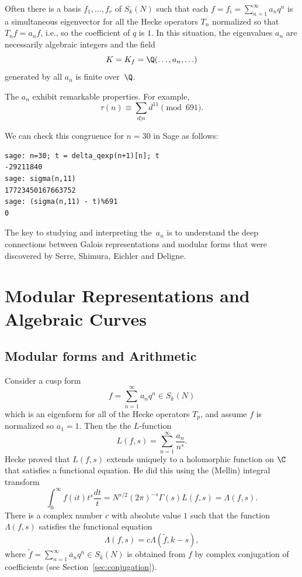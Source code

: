 \documentclass{report}
\begin{document}
Often
there is a basis $f_1,\ldots,f_r$ of
$S_k(N)$ such that each $f=f_i=\sum_{n=1}^{\infty} a_n q^n $ is a
simultaneous eigenvector for all the Hecke operators $T_n$
normalized so that $T_n f = a_n f$, i.e., so the
coefficient of $q$ is $1$.  In this situation, the eigenvalues $a_n$
are necessarily algebraic integers and the field
$$K = K_f = \Q(\ldots,a_n,\ldots)$$
generated by all $a_n$ is finite over~$\Q$.

The $a_n$ exhibit remarkable properties.
For example,
 $$\tau(n) \equiv \sum_{d|n}d^{11} \pmod {691}.$$

We can check this congruence for $n=30$ in Sage as follows:
\begin{lstlisting}
sage: n=30; t = delta_qexp(n+1)[n]; t
-29211840
sage: sigma(n,11)
17723450167663752
sage: (sigma(n,11) - t)%691
0
\end{lstlisting}

The key to studying and interpreting the~$a_n$
is to understand the deep connections between
Galois representations and modular forms
that were discovered by
Serre, Shimura,
Eichler and Deligne.

\chapter{Modular Representations and Algebraic Curves}

\section{Modular forms and Arithmetic}\label{sec:modformarith}
Consider a cusp form
      $$f=\sum_{n=1}^{\infty}a_n q^n\in S_k(N)$$
which is an eigenform for all of the Hecke operators $T_p$, and
assume $f$ is normalized
so $a_1 = 1$.  Then the  the $L$-function
 $$L(f,s)=\sum_{n=1}^{\infty} \frac{a_n}{n^s}.$$
Hecke proved that $L(f,s)$ extends uniquely to a holomorphic function
on $\C$ that satisfies a functional equation.  He did this
using the (Mellin) integral transform
$$
\int_{0}^{\infty} f(it)t^s \frac{dt}{t} = N^{s/2} (2\pi)^{-s} \Gamma(s) L(f,s) = \Lambda(f,s).
$$
There is a complex number $c$ with absolute value $1$
such that the function $\Lambda(f,s)$ satisfies the functional equation
$$
 \Lambda(f,s) = c \Lambda(\tilde{f}, k-s),
$$
where $\tilde{f} = \sum_{n=1}^{\infty} \overline{a}_n q^n \in S_k(N)$
is obtained from $f$ by complex conjugation of coefficients
(see Section~\ref{sec:conjugation}).
\end{document}
